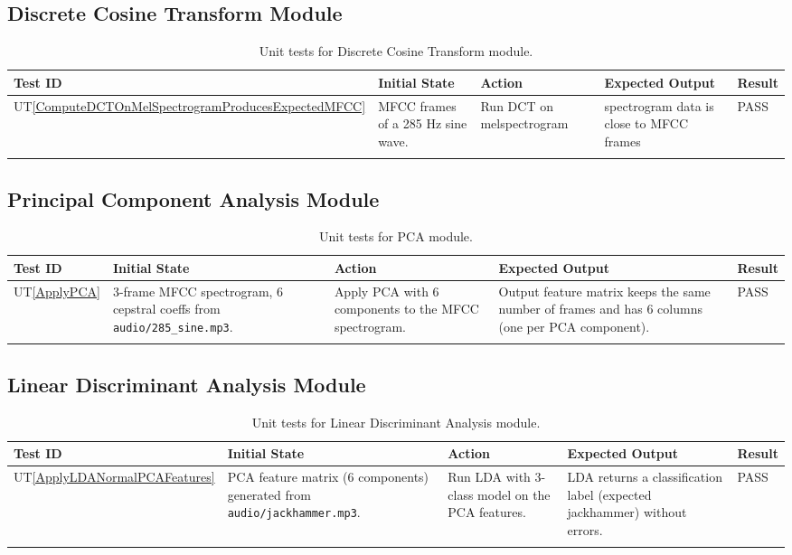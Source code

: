 \documentclass[12pt, titlepage]{article}
\newcommand{\utref}[1]{UT\ref{#1}}
\begin{document}
\subsection{Discrete Cosine Transform Module}
{\footnotesize
\begin{longtable}{|p{0.8cm}|p{3.5cm}|p{3.5cm}|p{3.5cm}|p{1cm}|}
    \hline
    \textbf{Test ID} & \textbf{Initial State} & \textbf{Action} &
    \textbf{Expected Output} & \textbf{Result} \\ 
    \endfirsthead
    \hline

    \utref{ComputeDCTOnMelSpectrogramProducesExpectedMFCC} & MFCC frames of a
    285 Hz sine wave. & Run DCT on melspectrogram & spectrogram data is close to
    MFCC frames & PASS\\
    \hline
    \caption{Unit tests for Discrete Cosine Transform module.}
    \label{tab:unit_test_dct}
\end{longtable}
}

\subsection{Principal Component Analysis Module}
{\footnotesize
\begin{longtable}{|p{0.8cm}|p{3.5cm}|p{3.5cm}|p{3.5cm}|p{1cm}|}
    \hline
    \textbf{Test ID} & \textbf{Initial State} & \textbf{Action} &
    \textbf{Expected Output} & \textbf{Result} \\ 
    \endfirsthead
    \hline

    \utref{ApplyPCA} & 3-frame MFCC spectrogram, 6 cepstral coeffs from
    \texttt{audio/285\_sine.mp3}. & Apply PCA with 6 components to the MFCC
    spectrogram.  & Output feature matrix keeps the same number of frames and
    has 6 columns (one per PCA component). & PASS\\
    \hline
    \caption{Unit tests for PCA module.}
    \label{tab:unit_test_pca}
\end{longtable}
}

\subsection{Linear Discriminant Analysis Module}
{\footnotesize
\begin{longtable}{|p{0.8cm}|p{3.5cm}|p{3.5cm}|p{3.5cm}|p{1cm}|}
    \hline
    \textbf{Test ID} & \textbf{Initial State} & \textbf{Action} &
    \textbf{Expected Output} & \textbf{Result} \\ 
    \endfirsthead
    \hline

    \utref{ApplyLDANormalPCAFeatures} & PCA feature matrix (6 components)
    generated from \texttt{audio/jackhammer.mp3}. & Run LDA with 3-class model
    on the PCA features.  & LDA returns a classification label (expected
    jackhammer) without errors. & PASS\\
    \hline
    \caption{Unit tests for Linear Discriminant Analysis module.}
    \label{tab:unit_test_lda}
\end{longtable}
}
\end{document}
